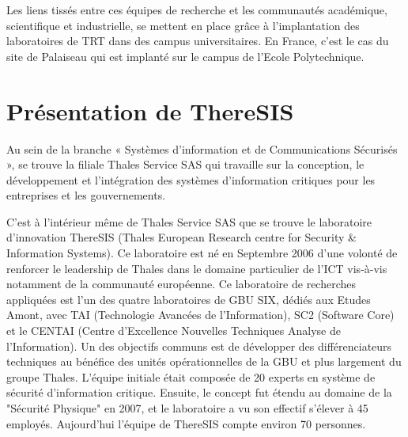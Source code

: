 Les liens tiss\'es entre ces \'equipes de recherche et les communaut\'es acad\'emique, scientifique et industrielle, se mettent en place grâce à l’implantation des laboratoires de TRT dans des campus universitaires. En France, c’est le cas du site de Palaiseau qui est implant\'e sur le campus de l’Ecole Polytechnique.





\section{Pr\'esentation de ThereSIS}
 Au sein de la branche « Systèmes d’information et de Communications S\'ecuris\'es », se trouve la filiale Thales Service SAS qui travaille sur la conception, le d\'eveloppement et l’int\'egration des systèmes d’information critiques pour les entreprises et les gouvernements.

 C’est à l’int\'erieur même de Thales Service SAS que se trouve le laboratoire d’innovation ThereSIS (Thales European Research centre for Security \& Information Systems). Ce laboratoire est n\'e en Septembre 2006 d’une volont\'e de renforcer le leadership de Thales dans le domaine particulier de l’ICT vis-à-vis notamment de la communaut\'e europ\'eenne. Ce laboratoire de recherches appliqu\'ees est l’un des quatre laboratoires de GBU SIX, d\'edi\'es aux Etudes Amont, avec TAI (Technologie Avanc\'ees de l’Information), SC2 (Software Core) et le CENTAI (Centre d’Excellence Nouvelles Techniques Analyse de l’Information). Un des objectifs communs est de d\'evelopper des diff\'erenciateurs techniques au b\'en\'efice des unit\'es op\'erationnelles de la GBU et plus largement du groupe Thales.  L’\'equipe initiale \'etait compos\'ee de 20 experts en système de s\'ecurit\'e d’information critique. Ensuite, le concept fut \'etendu au domaine de la "S\'ecurit\'e Physique" en 2007, et le laboratoire a vu son effectif s’\'elever à 45 employ\'es. Aujourd’hui l’\'equipe de ThereSIS compte environ 70 personnes.

